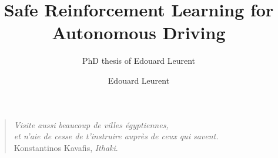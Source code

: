 \documentclass[a4paper,12pt,twoside,PageStyleII,authoryear,draft]{0-Misc/PhDThesisPSnPDF}
\title{Safe Reinforcement Learning for Autonomous Driving}
\subtitle{PhD thesis of Edouard Leurent}
\author{Edouard Leurent}
\begin{document}
	\frontmatter
	

	\begin{spacing}{1}
		\dominitoc
		\tableofcontents
	\end{spacing}

	\mainmatter

	

	

	\newpage

	\begin{small}   %

	\begin{spacing}{0.93}
		\printglossaries
		\label{chapter:nomenclature}
	\end{spacing}

	\begin{spacing}{1.00}%
	{%
		\let\cleardoublepage\clearpage%
		\listoffigures
		\let\cleardoublepage\clearpage%
		\listofalgorithms
		\let\cleardoublepage\clearpage%
		\listoftables
	}
	\end{spacing}

	\begin{spacing}{0.93}
		
%		
%		
		\cleardoublepage
		

		\vfill{}
		\hr{}		
		\begin{small}
			\begin{quote}
				\emph{Visite aussi beaucoup de villes égyptiennes,}\\
				\emph{et n’aie de cesse de t’instruire auprès de ceux qui savent.}\\
				Konstantinos Kavafis, \emph{Ithaki}.
			\end{quote}
		\end{small}
	\end{spacing}

	\end{small}


	\backmatter
	\cleartoleftpage

	
\end{document}
